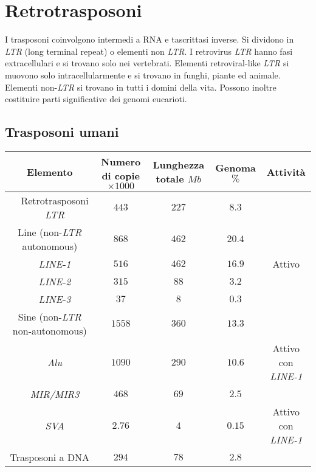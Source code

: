 \section{Retrotrasposoni}
I trasposoni coinvolgono intermedi a RNA e tascrittasi inverse.
Si dividono in \emph{LTR} (long terminal repeat) o elementi non \emph{LTR}.
I retrovirus \emph{LTR} hanno fasi extracellulari e si trovano solo nei vertebrati.
Elementi retroviral-like \emph{LTR} si muovono solo intracellularmente e si trovano in funghi, piante ed animale.
Elementi non-\emph{LTR} si trovano in tutti i domini della vita.
Possono inoltre costituire parti significative dei genomi eucarioti.
	
	\subsection{Trasposoni umani}
	\begin{center}
		\begin{tabular}{|c|c|c|c|c|c|}
			\hline
			\multicolumn{2}{|c|}{Elemento} & \makecell{Numero \\di copie \\$\times\num{1000}$} & \makecell{Lunghezza \\totale \\ $Mb$} & \makecell{Genoma \\ $\%$} & Attivit\`a \\
			\hline
						     & \makecell{Retrotrasposoni \\\emph{LTR}} & $443$ & $227$ & $8.3$ & \\
			\hline
			\multicolumn{2}{|c|}{Line (non-\emph{LTR} autonomous)}  & $868$ & $462$ & $20.4$ & \\
			\hline
						& \emph{LINE-1} & $516$ & $462$ & $16.9$ & Attivo \\
			\hline
						& \emph{LINE-2} & $315$ & $88$ & $3.2$ & \\
			\hline
						& \emph{LINE-3} & $37$ & $8$ & $0.3$ & \\
			\hline
			\multicolumn{2}{|c|}{Sine (non-\emph{LTR} non-autonomous)}  & $1558$ & $360$ & $13.3$ & \\
			\hline
						& \emph{Alu} & $1090$ & $290$ & $10.6$ & Attivo con \emph{LINE-1}\\
			\hline
						& \emph{MIR/MIR3} & $468$ & $69$ & $2.5$ & \\
			\hline
						& \emph{SVA} & $2.76$ & $4$ & $0.15$ & Attivo con \emph{LINE-1}\\
			\hline
			\multicolumn{2}{|c|}{Trasposoni a DNA} & $294$ & $78$ & $2.8$ & \\
			\hline
		\end{tabular}
	\end{center}


